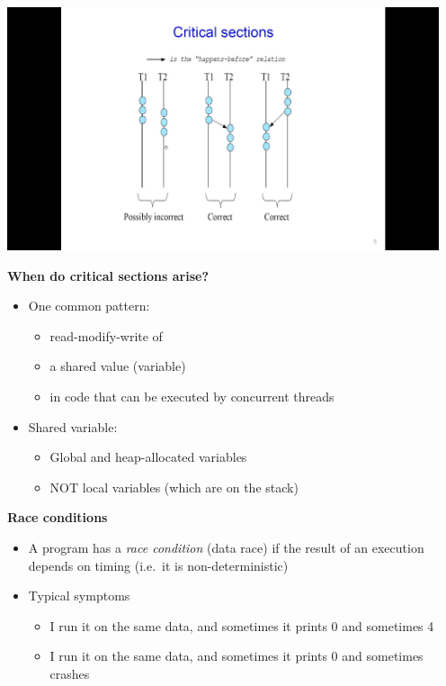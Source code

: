 \documentclass[11pt,a4paper]{article}
\begin{document}
\includegraphics[height=270]{critical-sections.jpg}

\textbf{When do critical sections arise?}
\begin{itemize}
    \item One common pattern:
        \begin{itemize}
            \item read-modify-write of
            \item a shared value (variable)
            \item in code that can be executed by concurrent threads
        \end{itemize}
    \item Shared variable:
        \begin{itemize}
            \item Global and heap-allocated variables
            \item NOT local variables (which are on the stack)
        \end{itemize}
\end{itemize}

\textbf{Race conditions}
\begin{itemize}
    \item A program has a \emph{race condition} (data race) if the result of an
        execution depends on timing (i.e.\ it is non-deterministic)
    \item Typical symptoms
        \begin{itemize}
            \item I run it on the same data, and sometimes it prints 0 and sometimes 4
            \item I run it on the same data, and sometimes it prints 0 and sometimes crashes
        \end{itemize}
\end{itemize}
\end{document}

